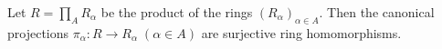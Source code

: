 Let $R = \prod_A R_\alpha$ be the product of the rings $(R_\alpha)_{\alpha \in A}$. Then the canonical projections $\pi_\alpha: R \rightarrow R_\alpha \; (\alpha \in A)$ are surjective ring homomorphisms.
